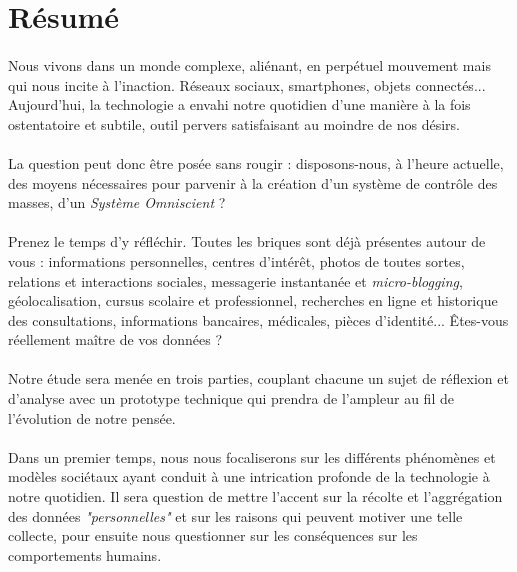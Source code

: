 \section*{Résumé}

\paragraph{} Nous vivons dans un monde complexe, aliénant, en perpétuel mouvement mais qui
nous incite à l'inaction. Réseaux sociaux, smartphones, objets connectés... Aujourd'hui, la
technologie a envahi notre quotidien d'une manière à la fois ostentatoire et subtile, outil
pervers satisfaisant au moindre de nos désirs.

\paragraph{} La question peut donc être posée sans rougir : disposons-nous, à l'heure
actuelle, des moyens nécessaires pour parvenir à la création d'un système de contrôle des
masses, d'un \emph{Système Omniscient} ?

\paragraph{} Prenez le temps d'y réfléchir. Toutes les briques sont déjà présentes autour
de vous : informations personnelles, centres d'intérêt, photos de toutes sortes, relations
et interactions sociales, messagerie instantanée et \emph{micro-blogging}, géolocalisation,
cursus scolaire et professionnel, recherches en ligne et historique des consultations,
informations bancaires, médicales, pièces d'identité... Êtes-vous réellement maître de vos
données ?

\paragraph{} Notre étude sera menée en trois parties, couplant chacune un sujet de réflexion
et d'analyse avec un prototype technique qui prendra de l'ampleur au fil de l'évolution de
notre pensée.

\paragraph{} Dans un premier temps, nous nous focaliserons sur les différents phénomènes
et modèles sociétaux ayant conduit à une intrication profonde de la technologie à notre
quotidien. Il sera question de mettre l'accent sur la récolte et l'aggrégation des données
\emph{"personnelles"} et sur les raisons qui peuvent motiver une telle collecte, pour ensuite
nous questionner sur les conséquences sur les comportements humains.

